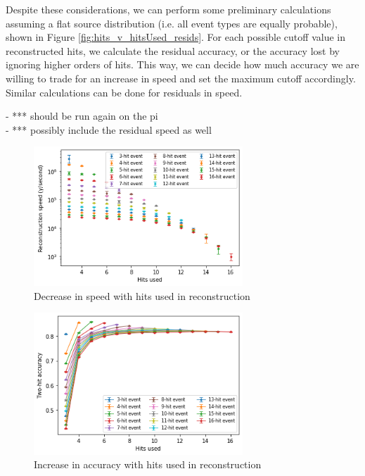 Despite these considerations, we can perform some preliminary calculations assuming a flat source distribution (i.e. all event types are equally probable), shown in Figure \ref{fig:hits_v_hitsUsed_resids}. For each possible cutoff value in reconstructed hits, we calculate the residual accuracy, or the accuracy lost by ignoring higher orders of hits. This way, we can decide how much accuracy we are willing to trade for an increase in speed and set the maximum cutoff accordingly. Similar calculations can be done for residuals in speed.

- *** should be run again on the pi\\
- *** possibly include the residual speed as well

\begin{figure}
    \centering
    \includegraphics[width=0.7\textwidth]{graphs/pi_hits_v_hitsUsed_speed.png}
    \caption{Decrease in speed with hits used in reconstruction}
    \label{fig:hits_v_hitsUsed_speed}
\end{figure}

\begin{figure}
    \centering
    \includegraphics[width=0.7\textwidth]{graphs/pi_hits_v_hitsUsed_accuracy.png}
    \caption{Increase in accuracy with hits used in reconstruction}
    \label{fig:hits_v_hitsUsed_acc}
\end{figure}

